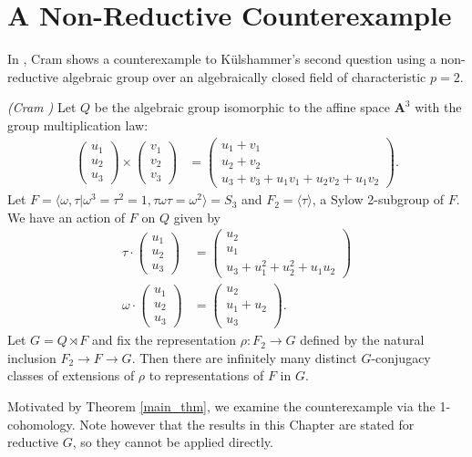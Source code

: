 \section{A Non-Reductive Counterexample}
In \cite[Appendix]{slodowy1997two}, Cram shows a counterexample to K\"ulshammer's second question using a non-reductive algebraic group over an algebraically closed field of characteristic $p=2$.
\begin{example}\emph{(Cram \cite[Appendix]{slodowy1997two})} Let $Q$ be the algebraic group isomorphic to the affine space $\mathbf{A}^3$ with the group multiplication law:
\begin{align*}
	\left(\begin{matrix} u_1 \\ u_2 \\ u_3 \end{matrix}\right) \times
	\left(\begin{matrix} v_1 \\ v_2 \\ v_3 \end{matrix}\right) &=
	\left(\begin{matrix} u_1 + v_1 \\ u_2 + v_2 \\ u_3 + v_3 + u_1v_1 + u_2v_2 + u_1v_2 \end{matrix}\right).
\end{align*}
Let $F = \langle \omega, \tau | \omega^3 = \tau^2 = 1, \tau\omega\tau = \omega^2 \rangle = S_3$ and $F_2 = \langle \tau \rangle$, a Sylow 2-subgroup of $F$. We have an action of $F$ on $Q$ given by
\begin{align*}
	\tau \cdot \left(\begin{matrix} u_1 \\ u_2 \\ u_3 \end{matrix} \right) &=
	\left(\begin{matrix} u_2 \\ u_1 \\ u_3 + u_1^2 + u_2^2 + u_1u_2 \end{matrix} \right) \\
	\omega \cdot \left(\begin{matrix} u_1 \\ u_2 \\ u_3 \end{matrix} \right) &=
	\left(\begin{matrix} u_2 \\ u_1 + u_2 \\ u_3 \end{matrix} \right).
\end{align*}
Let $G = Q \rtimes F$ and fix the representation $\rho:F_2 \rightarrow G$ defined by the natural inclusion $F_2 \rightarrow F \rightarrow G$. Then there are infinitely many distinct $G$-conjugacy classes of extensions of $\rho$ to representations of $F$ in $G$.
\label{eg:non_red}
\end{example}
Motivated by Theorem \ref{main_thm}, we examine the counterexample via the 1-cohomology. Note however that the results in this Chapter are stated for reductive $G$, so they cannot be applied directly.

